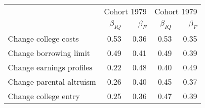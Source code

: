 \begin{tabular}{lrrrr}
\hline
   & \multicolumn{2}{|c|}{Cohort 1979} & \multicolumn{2}{|c|}{Cohort 1979} \\ 
 & $\beta_{IQ}$  & $\beta_{F}$  & $\beta_{IQ}$  & $\beta_{F}$  \\ 
\hline
Change college costs & 0.53  & 0.36  & 0.53  & 0.35  \\ 
Change borrowing limit & 0.49  & 0.41  & 0.49  & 0.39  \\ 
Change earnings profiles & 0.22  & 0.48  & 0.40  & 0.49  \\ 
Change parental altruism & 0.26  & 0.40  & 0.45  & 0.37  \\ 
Change college entry & 0.25  & 0.36  & 0.47  & 0.39  \\ 
\hline
\end{tabular}%
